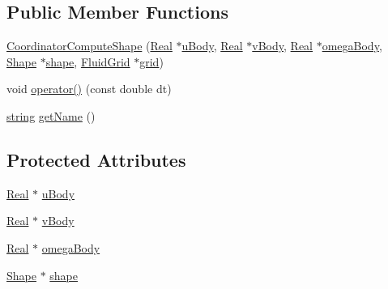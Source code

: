 \subsection*{Public Member Functions}
\begin{DoxyCompactItemize}
\item 
\hyperlink{class_coordinator_compute_shape_abbd719f8faf9f24f1ed88cf4e5151b46}{Coordinator\+Compute\+Shape} (\hyperlink{_h_d_f5_dumper_8h_a445a5f0e2a34c9d97d69a3c2d1957907}{Real} $\ast$\hyperlink{class_coordinator_compute_shape_adc09b276b152cb1efd9ce1af98f7642a}{u\+Body}, \hyperlink{_h_d_f5_dumper_8h_a445a5f0e2a34c9d97d69a3c2d1957907}{Real} $\ast$\hyperlink{class_coordinator_compute_shape_ae4f0f03770ea60b05034bd0a1fdddf45}{v\+Body}, \hyperlink{_h_d_f5_dumper_8h_a445a5f0e2a34c9d97d69a3c2d1957907}{Real} $\ast$\hyperlink{class_coordinator_compute_shape_ad8fc7ad631324607d5d887d7c79ae0b7}{omega\+Body}, \hyperlink{class_shape}{Shape} $\ast$\hyperlink{class_coordinator_compute_shape_a0a772cc3cb7014cdf9f271b3b4792a3c}{shape}, \hyperlink{_definitions_8h_aff3288a3741f5098bcc456bb13440189}{Fluid\+Grid} $\ast$\hyperlink{class_generic_coordinator_aa514bbf7394bb5519c6f12daa33a375a}{grid})
\item 
void \hyperlink{class_coordinator_compute_shape_a3c3eb6c738617c70ba72a74fe8a10038}{operator()} (const double dt)
\item 
\hyperlink{testfpzip_8cpp_a984bb8e04129c4268bd6ff36a50c9fa4}{string} \hyperlink{class_coordinator_compute_shape_a13134ee7d7f1fa7f39da8122e788e048}{get\+Name} ()
\end{DoxyCompactItemize}
\subsection*{Protected Attributes}
\begin{DoxyCompactItemize}
\item 
\hyperlink{_h_d_f5_dumper_8h_a445a5f0e2a34c9d97d69a3c2d1957907}{Real} $\ast$ \hyperlink{class_coordinator_compute_shape_adc09b276b152cb1efd9ce1af98f7642a}{u\+Body}
\item 
\hyperlink{_h_d_f5_dumper_8h_a445a5f0e2a34c9d97d69a3c2d1957907}{Real} $\ast$ \hyperlink{class_coordinator_compute_shape_ae4f0f03770ea60b05034bd0a1fdddf45}{v\+Body}
\item 
\hyperlink{_h_d_f5_dumper_8h_a445a5f0e2a34c9d97d69a3c2d1957907}{Real} $\ast$ \hyperlink{class_coordinator_compute_shape_ad8fc7ad631324607d5d887d7c79ae0b7}{omega\+Body}
\item 
\hyperlink{class_shape}{Shape} $\ast$ \hyperlink{class_coordinator_compute_shape_a0a772cc3cb7014cdf9f271b3b4792a3c}{shape}
\end{DoxyCompactItemize}
